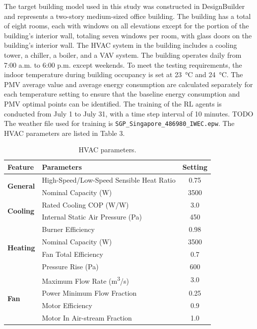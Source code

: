 \documentclass[preprint,12pt]{elsarticle}
\begin{document}
The target building model used in this study was constructed in DesignBuilder 
and represents a two-story medium-sized office building. 
The building has a total of eight rooms, each with windows on all elevations 
except for the portion of the building's interior wall, totaling seven windows per room, 
with glass doors on the building's interior wall. The HVAC system in the building 
includes a cooling tower, a chiller, a boiler, and a VAV system. 
The building operates daily from 7:00 a.m. to 6:00 p.m. except weekends.
To meet the testing requirements, the indoor temperature during building occupancy 
is set at \SI{23}{\celsius} and \SI{24}{\celsius}.
The PMV average value and average energy consumption are calculated 
separately for each temperature setting to ensure that the baseline energy consumption 
and PMV optimal points can be identified. 
The training of the RL agents is conducted from July 1 to July 31, 
with a time step interval of 10 minutes. 
TODO The weather file used for training is \texttt{SGP_Singapore_486980_IWEC.epw}.
The HVAC parameters are listed in Table 3. 
\begin{table}[h!]
\centering
\caption{HVAC parameters.}
\begin{tabular}{@{}llc@{}}
\toprule
\textbf{Feature} & \textbf{Parameters} & \textbf{Setting} \\ \midrule
\multirow{2}{*}{\textbf{General}} 
    & High-Speed/Low-Speed Sensible Heat Ratio & 0.75 \\
    & Nominal Capacity (W) & 3500 \\ \midrule
\multirow{2}{*}{\textbf{Cooling}} 
    & Rated Cooling COP (W/W) & 3.0 \\
    & Internal Static Air Pressure (Pa) & 450 \\ \midrule
\multirow{4}{*}{\textbf{Heating}} 
    & Burner Efficiency & 0.98 \\
    & Nominal Capacity (W) & 3500 \\
    & Fan Total Efficiency & 0.7 \\
    & Pressure Rise (Pa) & 600 \\ \midrule
\multirow{4}{*}{\textbf{Fan}} 
    & Maximum Flow Rate (m\textsuperscript{3}/s) & 3.0 \\
    & Power Minimum Flow Fraction & 0.25 \\
    & Motor Efficiency & 0.9 \\
    & Motor In Air-stream Fraction & 1.0 \\ \bottomrule
\end{tabular}
\label{table:hvac_parameters}
\end{table}
\end{document}
